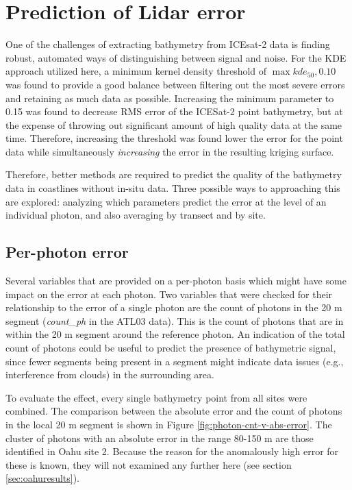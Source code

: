 \section{Prediction of Lidar error}

One of the challenges of extracting bathymetry from ICEsat-2 data is finding robust, automated ways of distinguishing between signal and noise. For the KDE approach utilized here, a minimum kernel density threshold of $\max{kde_{50},0.10}$ was found to provide a good balance between filtering out the most severe errors and retaining as much data as possible. Increasing the minimum parameter to 0.15 was found to decrease RMS error of the ICESat-2 point bathymetry, but at the expense of throwing out significant amount of high quality data at the same time. Therefore, increasing the threshold was found lower the error for the point data while simultaneously \emph{increasing} the error in the resulting kriging surface. 

Therefore, better methods are required to predict the quality of the bathymetry data in coastlines without in-situ data. Three possible ways to approaching this are explored: analyzing which parameters predict the error at the level of an individual photon, and also averaging by transect and by site.

\subsection{Per-photon error}
Several variables that are provided on a per-photon basis which might have some impact on the error at each photon. Two variables that were checked for their relationship to the error of a single photon are the count of photons in the 20 m segment (\emph{count\_ph} in the ATL03 data). This is the count of photons that are in within the 20 m segment around the reference photon. An indication of the total count of photons could be useful to predict the presence of bathymetric signal, since fewer segments being present in a segment might indicate data issues (e.g., interference from clouds) in the surrounding area. 

To evaluate the effect, every single bathymetry point from all sites were combined. The comparison between the absolute error and the count of photons in the local 20 m segment is shown in Figure \ref{fig:photon-cnt-v-abs-error}. The cluster of photons with an absolute error in the range 80-150 m are those identified in Oahu site 2. Because the reason for the anomalously high error for these is known, they will not examined any further here (see section \ref{sec:oahuresults}).

